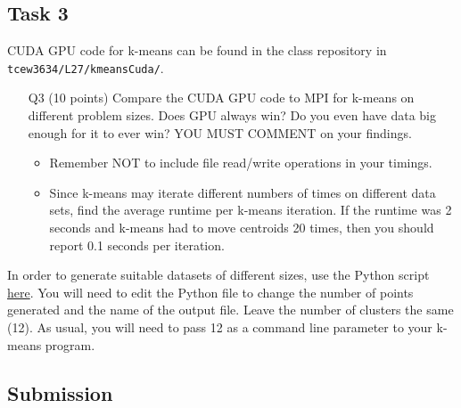 \subsection*{Task 3}
CUDA GPU code for k-means can be found in the class repository in \texttt{tcew3634/L27/kmeansCuda/}.
\begin{itemize}
\item [Q3] (10 points)
Compare the CUDA GPU code to MPI for k-means on different problem sizes.
Does GPU always win?
Do you even have data big enough for it to ever win?
YOU MUST COMMENT on your findings.
\begin{itemize}
    \item Remember NOT to include file read/write operations in your timings.
    \item Since k-means may iterate different numbers of times on different data sets,
    find the average runtime per k-means iteration.
    If the runtime was 2 seconds and k-means had to move centroids 20 times, then you should report 0.1 seconds per iteration.
\end{itemize}
\end{itemize}
In order to generate suitable datasets of different sizes, use the Python script \href{https://canvas.vt.edu/files/11774764/download?download_frd=1}{here}.
You will need to edit the Python file to change the number of points generated and the name of the output file.
Leave the number of clusters the same (12).
As usual, you will need to pass 12 as a command line parameter to your k-means program.

\subsection*{Submission}

